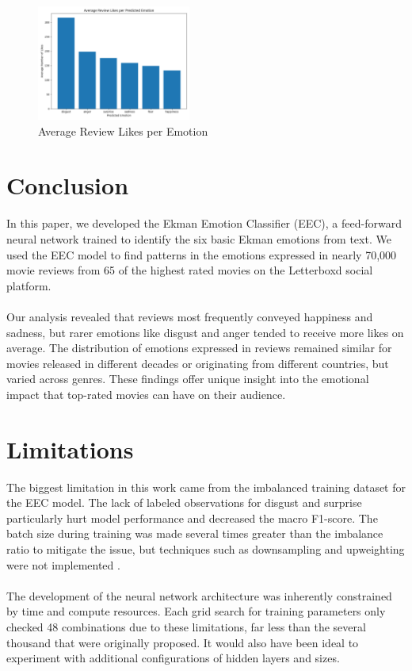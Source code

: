 \documentclass[11pt]{article}
\begin{document}
\renewcommand{\thefigure}{5.5}
\begin{figure}[h]
	\centering
	\includegraphics[width=0.45\textwidth]{average_likes_per_emotion.png}
	\caption{Average Review Likes per Emotion}
	\label{fig:average_likes_per_emotion}
\end{figure}
\section{Conclusion}
In this paper, we developed the Ekman Emotion Classifier (EEC), a feed-forward neural network trained to identify the six basic Ekman emotions from text. We used the EEC model to find patterns in the emotions expressed in nearly 70,000 movie reviews from 65 of the highest rated movies on the Letterboxd social platform. \\ \\
Our analysis revealed that reviews most frequently conveyed happiness and sadness, but rarer emotions like disgust and anger tended to receive more likes on average. The distribution of emotions expressed in reviews remained similar for movies released in different decades or originating from different countries, but varied across genres. These findings offer unique insight into the emotional impact that top-rated movies can have on their audience.
\section{Limitations}
The biggest limitation in this work came from the imbalanced training dataset for the EEC model. The lack of labeled observations for disgust and surprise particularly hurt model performance and decreased the macro F1-score. The batch size during training was made several times greater than the imbalance ratio to mitigate the issue, but techniques such as downsampling and upweighting were not implemented \cite{Imbalanced}. \\ \\
The development of the neural network architecture was inherently constrained by time and compute resources. Each grid search for training parameters only checked 48 combinations due to these limitations, far less than the several thousand that were originally proposed. It would also have been ideal to experiment with additional configurations of hidden layers and sizes.
\end{document}
